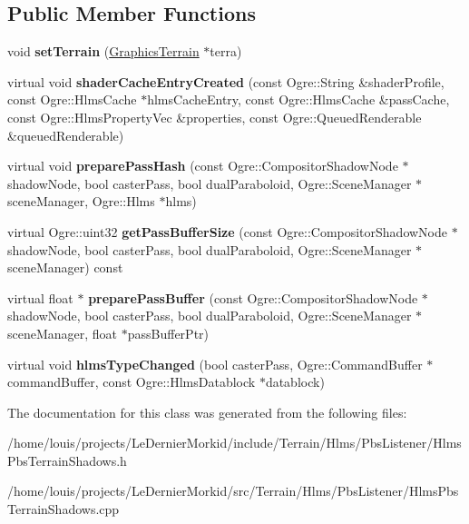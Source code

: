 \subsection*{Public Member Functions}
\begin{DoxyCompactItemize}
\item 
\mbox{\label{class_hlms_pbs_terrain_shadows_abc0156c34287dc229fc6bcd5dd926042}} 
void {\bfseries set\+Terrain} (\hyperlink{class_graphics_terrain}{Graphics\+Terrain} $\ast$terra)
\item 
\mbox{\label{class_hlms_pbs_terrain_shadows_a5d6c59561dd58544669c41271f96673b}} 
virtual void {\bfseries shader\+Cache\+Entry\+Created} (const Ogre\+::\+String \&shader\+Profile, const Ogre\+::\+Hlms\+Cache $\ast$hlms\+Cache\+Entry, const Ogre\+::\+Hlms\+Cache \&pass\+Cache, const Ogre\+::\+Hlms\+Property\+Vec \&properties, const Ogre\+::\+Queued\+Renderable \&queued\+Renderable)
\item 
\mbox{\label{class_hlms_pbs_terrain_shadows_ad8aab96d71ac61b3774d6b454455cf5c}} 
virtual void {\bfseries prepare\+Pass\+Hash} (const Ogre\+::\+Compositor\+Shadow\+Node $\ast$shadow\+Node, bool caster\+Pass, bool dual\+Paraboloid, Ogre\+::\+Scene\+Manager $\ast$scene\+Manager, Ogre\+::\+Hlms $\ast$hlms)
\item 
\mbox{\label{class_hlms_pbs_terrain_shadows_a71a669419504ad94fd31213ae547224f}} 
virtual Ogre\+::uint32 {\bfseries get\+Pass\+Buffer\+Size} (const Ogre\+::\+Compositor\+Shadow\+Node $\ast$shadow\+Node, bool caster\+Pass, bool dual\+Paraboloid, Ogre\+::\+Scene\+Manager $\ast$scene\+Manager) const
\item 
\mbox{\label{class_hlms_pbs_terrain_shadows_ad963e7633a906fd8b8ad4963a08f4770}} 
virtual float $\ast$ {\bfseries prepare\+Pass\+Buffer} (const Ogre\+::\+Compositor\+Shadow\+Node $\ast$shadow\+Node, bool caster\+Pass, bool dual\+Paraboloid, Ogre\+::\+Scene\+Manager $\ast$scene\+Manager, float $\ast$pass\+Buffer\+Ptr)
\item 
\mbox{\label{class_hlms_pbs_terrain_shadows_aac00263a92c1b2ba60e10b87896f99cd}} 
virtual void {\bfseries hlms\+Type\+Changed} (bool caster\+Pass, Ogre\+::\+Command\+Buffer $\ast$command\+Buffer, const Ogre\+::\+Hlms\+Datablock $\ast$datablock)
\end{DoxyCompactItemize}


The documentation for this class was generated from the following files\+:\begin{DoxyCompactItemize}
\item 
/home/louis/projects/\+Le\+Dernier\+Morkid/include/\+Terrain/\+Hlms/\+Pbs\+Listener/Hlms\+Pbs\+Terrain\+Shadows.\+h\item 
/home/louis/projects/\+Le\+Dernier\+Morkid/src/\+Terrain/\+Hlms/\+Pbs\+Listener/Hlms\+Pbs\+Terrain\+Shadows.\+cpp\end{DoxyCompactItemize}
